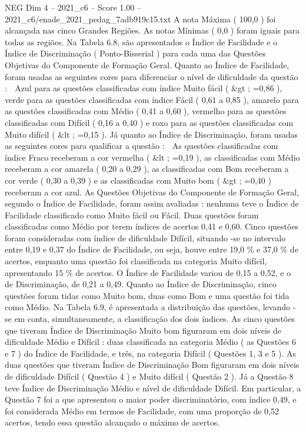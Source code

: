 \begin{textsample}{NEG Dim 4 – 2021\_c6 – Score 1.00 – 2021\_c6/enade\_2021\_pedag\_7adb919c15.txt}
A nota Máxima ( 100,0 ) foi alcançada nas cinco Grandes Regiões.
As notas Mínimas ( 0,0 ) foram iguais para todas as regiões.
Na Tabela 6.8, são apresentados o Índice de Facilidade e o Índice de Discriminação ( Ponto-Bisserial ) para cada uma das Questões Objetivas do Componente de Formação Geral.
Quanto ao Índice de Facilidade, foram usadas as seguintes cores para diferenciar o nível de dificuldade da questão :  Azul para as questões classificadas com índice Muito fácil ( \&gt ; =0,86 ), verde para as questões classificadas com índice Fácil ( 0,61 a 0,85 ), amarelo para as questões classificadas com Médio ( 0,41 a 0,60 ), vermelho para as questões classificadas com Difícil ( 0,16 a 0,40 ) e roxo para as questões classificadas com Muito difícil ( \&lt ; =0,15 ).
Já quanto ao Índice de Discriminação, foram usadas as seguintes cores para qualificar a questão :  As questões classificadas com índice Fraco receberam a cor vermelha ( \&lt ; =0,19 ), as classificadas com Médio receberam a cor amarela ( 0,20 a 0,29 ), as classificadas com Bom receberam a cor verde ( 0,30 a 0,39 ) e as classificadas com Muito bom ( \&gt ; =0,40 ) receberam a cor azul.
As Questões Objetivas do Componente de Formação Geral, segundo o Índice de Facilidade, foram assim avaliadas : nenhuma teve o Índice de Facilidade classificado como Muito fácil ou Fácil.
Duas questões foram classificadas como Médio por terem índices de acertos 0,41 e 0,60.
Cinco questões foram consideradas com índice de dificuldade Difícil, situando -se no intervalo entre 0,19 e 0,37 do Índice de Facilidade, ou seja, houve entre 19,0 \% e 37,0 \% de acertos, enquanto uma questão foi classificada na categoria Muito difícil, apresentando 15 \% de acertos.
O Índice de Facilidade variou de 0,15 a 0,52, e o de Discriminação, de 0,21 a 0,49.
Quanto ao Índice de Discriminação, cinco questões foram tidas como Muito bom, duas como Bom e uma questão foi tida como Médio.
Na Tabela 6.9, é apresentada a distribuição das questões, levando -se em conta, simultaneamente, a classificação dos dois índices.
As cinco questões que tiveram Índice de Discriminação Muito bom figuraram em dois níveis de dificuldade Médio e Difícil : duas classificada na categoria Médio ( as Questões 6 e 7 ) do Índice de Facilidade, e três, na categoria Difícil ( Questões 1, 3 e 5 ).
As duas questões que tiveram Índice de Discriminação Bom figuraram em dois níveis de dificuldade Difícil ( Questão 4 ) e Muito difícil ( Questão 2 ).
Já a Questão 8 teve Índice de Discriminação Médio e nível de dificuldade Difícil.
Em particular, a Questão 7 foi a que apresentou o maior poder discriminatório, com índice 0,49, e foi considerada Médio em termos de Facilidade, com uma proporção de 0,52 acertos, tendo essa questão alcançado o máximo de acertos.

\end{textsample}
